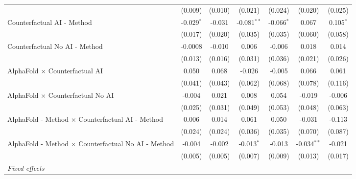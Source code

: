 \begin{tabular}{lcccccc}
                                                              & (0.009)      & (0.010)       & (0.021)       & (0.024)      & (0.020)       & (0.025)\\   
   Counterfactual AI - Method                                 & -0.029$^{*}$ & -0.031        & -0.081$^{**}$ & -0.066$^{*}$ & 0.067         & 0.105$^{*}$\\   
                                                              & (0.017)      & (0.020)       & (0.035)       & (0.035)      & (0.060)       & (0.058)\\   
   Counterfactual No AI - Method                              & -0.0008      & -0.010        & 0.006         & -0.006       & 0.018         & 0.014\\   
                                                              & (0.013)      & (0.016)       & (0.031)       & (0.036)      & (0.021)       & (0.026)\\   
   AlphaFold $\times$ Counterfactual AI                       & 0.050        & 0.068         & -0.026        & -0.005       & 0.066         & 0.061\\   
                                                              & (0.041)      & (0.043)       & (0.062)       & (0.068)      & (0.078)       & (0.116)\\   
   AlphaFold $\times$ Counterfactual No AI                    & -0.004       & 0.021         & 0.008         & 0.054        & -0.019        & -0.006\\   
                                                              & (0.025)      & (0.031)       & (0.049)       & (0.053)      & (0.048)       & (0.063)\\   
   AlphaFold - Method $\times$ Counterfactual AI - Method     & 0.006        & 0.014         & 0.061         & 0.050        & -0.031        & -0.113\\   
                                                              & (0.024)      & (0.024)       & (0.036)       & (0.035)      & (0.070)       & (0.087)\\   
   AlphaFold - Method $\times$ Counterfactual No AI - Method  & -0.004       & -0.002        & -0.013$^{*}$  & -0.013       & -0.034$^{**}$ & -0.021\\   
                                                              & (0.005)      & (0.005)       & (0.007)       & (0.009)      & (0.013)       & (0.017)\\   
   \midrule
   \emph{Fixed-effects}\\

\end{tabular}
